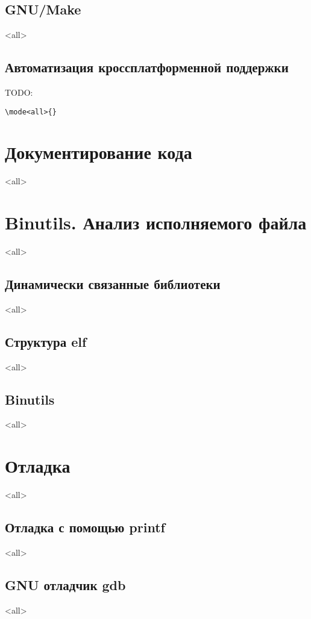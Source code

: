 \section{GNU/Make}
\mode<all>{}

\section{Автоматизация кроссплатформенной поддержки}
TODO: 
\begin{verbatim}
\mode<all>{}
\end{verbatim}

\chapter{Документирование кода}
\mode<all>{}

\chapter{Binutils. Анализ исполняемого файла}
\mode<all>{}
\section{Динамически связанные библиотеки}
\mode<all>{}
\section{Структура elf}
\mode<all>{}
\section{Binutils}
\mode<all>{}

\chapter{Отладка}
\mode<all>{}
\section{Отладка с помощью printf}
\mode<all>{}
\section{GNU отладчик gdb}
\mode<all>{}

